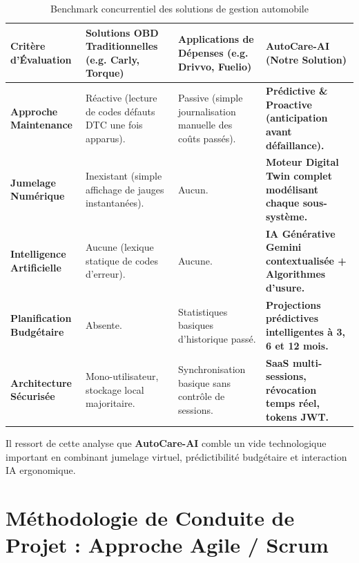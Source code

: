 \documentclass[12pt,a4paper,twoside,openright]{report}
\begin{document}
  \begin{table}[H]
  \centering
  \small
  \begin{tabularx}{\textwidth}{p{3.2cm} X X X}
  \toprule
  \textbf{Crit\`ere d'\'Evaluation} & \textbf{Solutions OBD Traditionnelles (e.g. Carly, Torque)} & \textbf{Applications de D\'epenses (e.g. Drivvo, Fuelio)} & \textbf{AutoCare-AI (Notre Solution)} \\
  \midrule
  \textbf{Approche Maintenance} & R\'eactive (lecture de codes d\'efauts DTC une fois apparus). & Passive (simple journalisation manuelle des co\^uts pass\'es). & \textbf{Pr\'edictive \& Proactive (anticipation avant d\'efaillance).} \\
  \addlinespace
  \textbf{Jumelage Num\'erique} & Inexistant (simple affichage de jauges instantan\'ees). & Aucun. & \textbf{Moteur Digital Twin complet mod\'elisant chaque sous-syst\`eme.} \\
  \addlinespace
  \textbf{Intelligence Artificielle} & Aucune (lexique statique de codes d'erreur). & Aucune. & \textbf{IA G\'en\'erative Gemini contextualis\'ee + Algorithmes d'usure.} \\
  \addlinespace
  \textbf{Planification Budg\'etaire} & Absente. & Statistiques basiques d'historique pass\'e. & \textbf{Projections pr\'edictives intelligentes \`a 3, 6 et 12 mois.} \\
  \addlinespace
  \textbf{Architecture S\'ecuris\'ee} & Mono-utilisateur, stockage local majoritaire. & Synchronisation basique sans contr\^ole de sessions. & \textbf{SaaS multi-sessions, r\'evocation temps r\'eel, tokens JWT.} \\
  \bottomrule
  \end{tabularx}
  \caption{Benchmark concurrentiel des solutions de gestion automobile}
  \label{tab:benchmark}
  \end{table}

  Il ressort de cette analyse que \textbf{AutoCare-AI} comble un vide technologique important en combinant jumelage virtuel, pr\'edictibilit\'e budg\'etaire et interaction IA ergonomique.

  \section{M\'ethodologie de Conduite de Projet : Approche Agile / Scrum}
\end{document}
